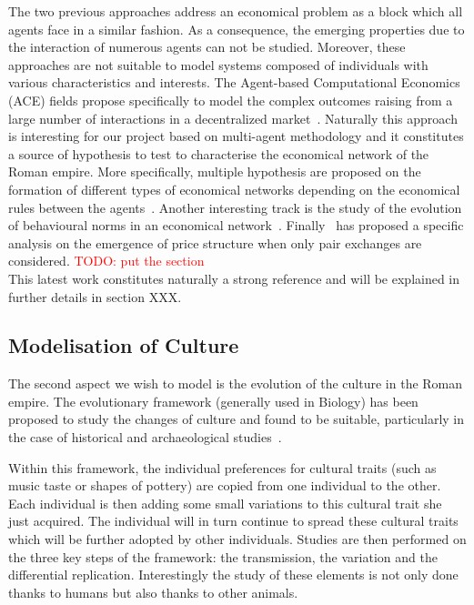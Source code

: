\documentclass{wscpaperproc}
\newcommand{\memo}[2]{\textcolor{#1}{#2}}
\newcommand{\todo}[1]{\memo{red}{TODO: #1\\}}
\begin{document}
The two previous approaches address an economical problem as a block which all agents face in a similar fashion. As a consequence, the emerging properties due to the interaction of numerous agents can not be studied. Moreover, these approaches are not suitable to model systems composed of individuals with various characteristics and interests. The Agent-based Computational Economics (ACE) fields propose specifically to model the complex outcomes raising from a large number of interactions in a decentralized market~\cite{tesfatsion_agent-based_2003}. Naturally this approach is interesting for our project based on multi-agent methodology and it constitutes a source of hypothesis to test to characterise the economical network of the Roman empire. More specifically, multiple hypothesis are proposed on the formation of different types of economical networks depending on the economical rules between the agents~\cite{kirman_evolving_2001,tesfatsion_structure_2001}. Another interesting track is the study of the evolution of behavioural norms in an economical network~\cite{epstein_learning_2001,axelrod_complexity_1997}. Finally~\cite{gintis_emergence_2006} has proposed a specific analysis on the emergence of price structure when only pair exchanges are considered. 
\todo{put the section}
This latest work constitutes naturally a strong reference and will be explained in further details in section XXX.


\subsection{Modelisation of Culture}

The second aspect we wish to model is the evolution of the culture in the Roman empire. The evolutionary framework (generally used in Biology) has been proposed to study the changes of culture and found to be suitable,  particularly in the case of historical and archaeological studies~\cite{lycett_cultural_2015,henrich_evolution_2003}.

Within this framework, the individual preferences for cultural traits (such as music taste or shapes of pottery) are copied from one individual to the other. Each individual is then adding some small variations to this cultural trait she just acquired. The individual will in turn continue to spread these cultural traits which will be further adopted by other individuals. Studies are then performed on the three key steps of the framework: the transmission, the variation and the differential replication. Interestingly the study of these elements is not only done thanks to humans but also thanks to other animals.
\end{document}
